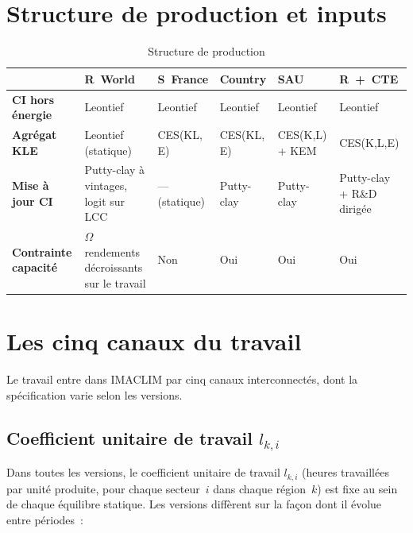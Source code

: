 \section{Structure de production et inputs}

\begin{table}[htbp]
\centering
\caption{Structure de production}\label{tab:imaclim-production}
\small
\begin{tabular}{p{2.8cm}p{2.2cm}p{2.2cm}p{2.2cm}p{2.2cm}p{2.2cm}}
\toprule
 & \textbf{R~World} & \textbf{S~France} & \textbf{Country} & \textbf{SAU} & \textbf{R~+~CTE} \\
\midrule
\textbf{CI hors énergie} & Leontief & Leontief & Leontief & Leontief & Leontief \\
\addlinespace
\textbf{Agrégat KLE} & Leontief (statique) & CES(KL, E) & CES(KL, E) & CES(K,L) + KEM & CES(K,L,E) \\
\addlinespace
\textbf{Mise à jour CI} & Putty-clay à vintages, logit sur LCC & --- (statique) & Putty-clay & Putty-clay & Putty-clay + R\&D dirigée \\
\addlinespace
\textbf{Contrainte capacité} & $\Omega$ rendements décroissants sur le travail & Non & Oui & Oui & Oui \\
\bottomrule
\end{tabular}
\end{table}

\section{Les cinq canaux du travail}

Le travail entre dans IMACLIM par cinq canaux interconnectés, dont la spécification varie selon les versions.

\subsection{Coefficient unitaire de travail $l_{k,i}$}

Dans toutes les versions, le coefficient unitaire de travail $l_{k,i}$ (heures travaillées par unité produite, pour chaque secteur~$i$ dans chaque région~$k$) est fixe au sein de chaque équilibre statique. Les versions diffèrent sur la façon dont il évolue entre périodes~:

